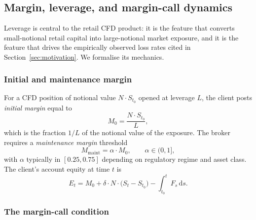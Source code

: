 \documentclass[preprint,12pt,authoryear]{elsarticle}
\newcommand{\dd}{\mathrm{d}}
\theoremstyle{definition}
\begin{document}
\subsection{Margin, leverage, and margin-call dynamics}
\label{sec:margin}

Leverage is central to the retail CFD product: it is the feature that
converts small-notional retail capital into large-notional market
exposure, and it is the feature that drives the empirically observed
loss rates cited in Section~\ref{sec:motivation}. We formalise its
mechanics.

\subsubsection{Initial and maintenance margin}
\label{sec:margin-levels}

For a CFD position of notional value $N \cdot S_{t_0}$ opened at
leverage $L$, the client posts \emph{initial margin} equal to
\begin{equation}
    M_0 = \frac{N \cdot S_{t_0}}{L},
    \label{eq:initial-margin}
\end{equation}
which is the fraction $1/L$ of the notional value of the exposure. The
broker requires a \emph{maintenance margin} threshold
\begin{equation}
    M_{\text{maint}} = \alpha \cdot M_0,
    \qquad \alpha \in (0, 1],
    \label{eq:maintenance-margin}
\end{equation}
with $\alpha$ typically in $[0.25, 0.75]$ depending on regulatory
regime and asset class. The client's account equity at time $t$ is
\begin{equation}
    E_t = M_0 + \delta \cdot N \cdot \bigl( S_t - S_{t_0} \bigr)
          - \int_{t_0}^{t} F_s \, \dd s.
    \label{eq:equity}
\end{equation}

\subsubsection{The margin-call condition}
\label{sec:margin-call}
\end{document}
